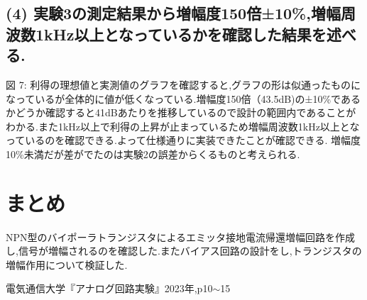 \documentclass[a4j,10pt,dvipdfmx]{jarticle}
\begin{document}
\subsection{(4) 実験3の測定結果から増幅度150倍±10\%,増幅周波数1kHz以上となっているかを確認した結果を述べる.}
図 7: 利得の理想値と実測値のグラフを確認すると,グラフの形は似通ったものになっているが全体的に値が低くなっている.増幅度150倍（43.5dB)の±10\%であるかどうか確認すると41dBあたりを推移しているので設計の範囲内であることがわかる.また1kHz以上で利得の上昇が止まっているため増幅周波数1kHz以上となっているのを確認できる.よって仕様通りに実装できたことが確認できる.
増幅度10\%未満だが差がでたのは実験2の誤差からくるものと考えられる.

\section{まとめ}
NPN型のバイポーラトランジスタによるエミッタ接地電流帰還増幅回路を作成し,信号が増幅されるのを確認した.またバイアス回路の設計をし,トランジスタの増幅作用について検証した.

\begin{thebibliography}{9}
   電気通信大学『アナログ回路実験』2023年,p10$\sim$15
\end{thebibliography}
\end{document}
